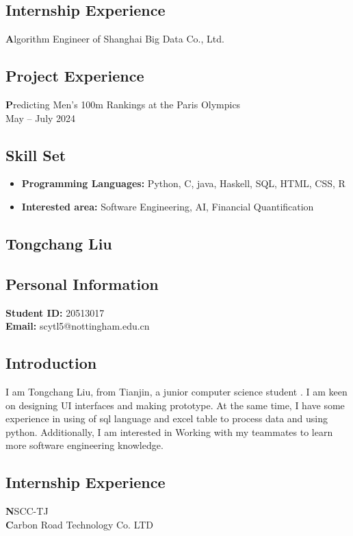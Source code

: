 \documentclass[a4paper,12pt]{article}
\begin{document}
    \subsection*{Internship Experience}
    \textbf	Algorithm Engineer of Shanghai Big Data Co., Ltd.
    
    \subsection*{Project Experience}
    \textbf Predicting Men's 100m Rankings at the Paris Olympics \\
    May -- July 2024
    
    \subsection*{Skill Set}
    \begin{itemize}
        \item \textbf{Programming Languages:} Python, C, java, Haskell, SQL, HTML, CSS, R
        \item \textbf{Interested area:} Software Engineering, AI, Financial Quantification
    \end{itemize}
    
    \subsection{Tongchang Liu}
    \subsection*{Personal Information}
    \textbf{Student ID:} 20513017 \\
    \textbf{Email:} scytl5@nottingham.edu.cn
    
    \subsection*{Introduction}
    I am Tongchang Liu, from Tianjin, a junior computer science student . I am keen on designing UI interfaces and making prototype. At the same time, I have some experience in using of sql language and excel table to process data and using python. Additionally, I am interested in Working with my teammates to learn more software engineering knowledge.
    
    \subsection*{Internship Experience}
    \textbf	NSCC-TJ\\
    \textbf Carbon Road Technology Co. LTD\\
    
\end{document}
